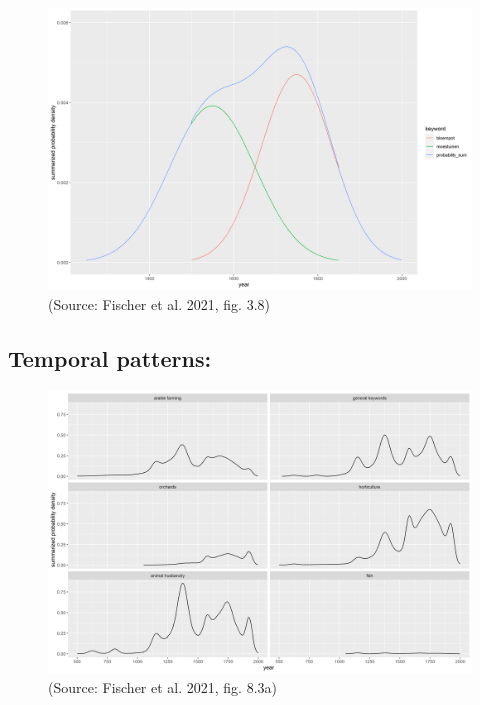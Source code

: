 \documentclass[
  letterpaper,
  DIV=11,
  numbers=noendperiod]{scrartcl}
\begin{document}
\begin{figure}

{\centering \includegraphics{images/Figure_3.8_example_year_density_sum.png}

}

\caption{(Source: Fischer et al. 2021, fig. 3.8)}

\end{figure}

\hypertarget{temporal-patterns}{%
\subsection{Temporal patterns:}\label{temporal-patterns}}

\begin{figure}

{\centering \includegraphics{images/Figure_8.3a_thema_year_density_sum.png}

}

\caption{(Source: Fischer et al. 2021, fig. 8.3a)}

\end{figure}
\end{document}
